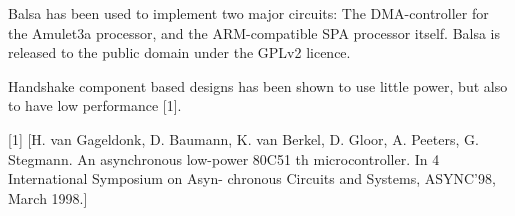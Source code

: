 Balsa has been used to implement two major circuits: The
DMA-controller for the Amulet3a processor, and the ARM-compatible SPA
processor itself. Balsa is released to the public domain under the
GPLv2 licence.

Handshake component based designs has been shown to use little power,
but also to have low performance [1].



[1] [H. van Gageldonk, D. Baumann,
  K. van Berkel, D. Gloor, A.
Peeters, G. Stegmann. An asynchronous low-power 80C51
                     th
microcontroller. In 4 International Symposium on Asyn-
chronous Circuits and Systems, ASYNC’98, March 1998.]

